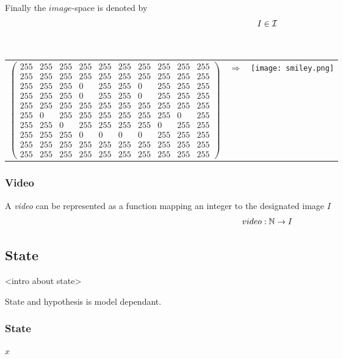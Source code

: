 Finally the $image$-space is denoted by
\begin{equation}
    I \in \mathcal{I}
\end{equation}

\begin{example}~\\
    \begin{tabular}{lcr}
        $
        \begin{pmatrix} 
        255&  255&  255&  255&  255&  255&  255&  255&  255&  255\\
        255&  255&  255&  255&  255&  255&  255&  255&  255&  255\\
        255&  255&  255&    0&  255&  255&    0&  255&  255&  255\\
        255&  255&  255&    0&  255&  255&    0&  255&  255&  255\\
        255&  255&  255&  255&  255&  255&  255&  255&  255&  255\\
        255&    0&  255&  255&  255&  255&  255&  255&    0&  255\\
        255&  255&    0&  255&  255&  255&  255&    0&  255&  255\\
        255&  255&  255&    0&    0&    0&    0&  255&  255&  255\\
        255&  255&  255&  255&  255&  255&  255&  255&  255&  255\\
        255&  255&  255&  255&  255&  255&  255&  255&  255&  255
        \end{pmatrix}
       $
       &$\Rightarrow$& \parbox[c]{1em}{\texttt{[image: smiley.png]}}
    \end{tabular}
\end{example}

\subsubsection{Video}
A \emph{video} can be represented as a function mapping an integer to the designated image $I$
\begin{equation}
    video : \mathbb{N} \rightarrow I
\end{equation}

\subsection{State}
<intro about state>
\begin{note}
    State and hypothesis is model dependant.
\end{note}
\subsubsection{State}
$x$
